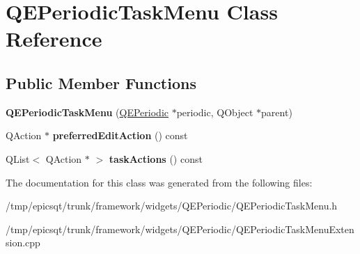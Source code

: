 \hypertarget{classQEPeriodicTaskMenu}{
\section{QEPeriodicTaskMenu Class Reference}
\label{classQEPeriodicTaskMenu}
}
\subsection*{Public Member Functions}
\begin{DoxyCompactItemize}
\item 
\hypertarget{classQEPeriodicTaskMenu_a585d012284f9de1aacbac71001b47434}{
{\bfseries QEPeriodicTaskMenu} (\hyperlink{classQEPeriodic}{QEPeriodic} $\ast$periodic, QObject $\ast$parent)}
\label{classQEPeriodicTaskMenu_a585d012284f9de1aacbac71001b47434}

\item 
\hypertarget{classQEPeriodicTaskMenu_a1c0b1c55f50104a853a08f948e704304}{
QAction $\ast$ {\bfseries preferredEditAction} () const }
\label{classQEPeriodicTaskMenu_a1c0b1c55f50104a853a08f948e704304}

\item 
\hypertarget{classQEPeriodicTaskMenu_a050761c5030a814aad42d62795d78af7}{
QList$<$ QAction $\ast$ $>$ {\bfseries taskActions} () const }
\label{classQEPeriodicTaskMenu_a050761c5030a814aad42d62795d78af7}

\end{DoxyCompactItemize}


The documentation for this class was generated from the following files:\begin{DoxyCompactItemize}
\item 
/tmp/epicsqt/trunk/framework/widgets/QEPeriodic/QEPeriodicTaskMenu.h\item 
/tmp/epicsqt/trunk/framework/widgets/QEPeriodic/QEPeriodicTaskMenuExtension.cpp\end{DoxyCompactItemize}
